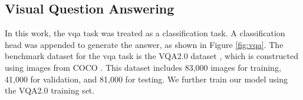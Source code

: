\subsection{Visual Question Answering}
In this work, the \acrfull{vqa} task was treated as a classification task.
A classification head was appended to generate the answer, as shown in Figure \ref{fig:vqa}.
The benchmark dataset for the \acrshort{vqa} task is the VQA2.0 dataset \cite{vqa2}, which is constructed using images from COCO \cite{mscoco}.  
This dataset includes 83,000 images for training, 41,000 for validation, and 81,000 for testing.  
We further train our model using the VQA2.0 training set.
